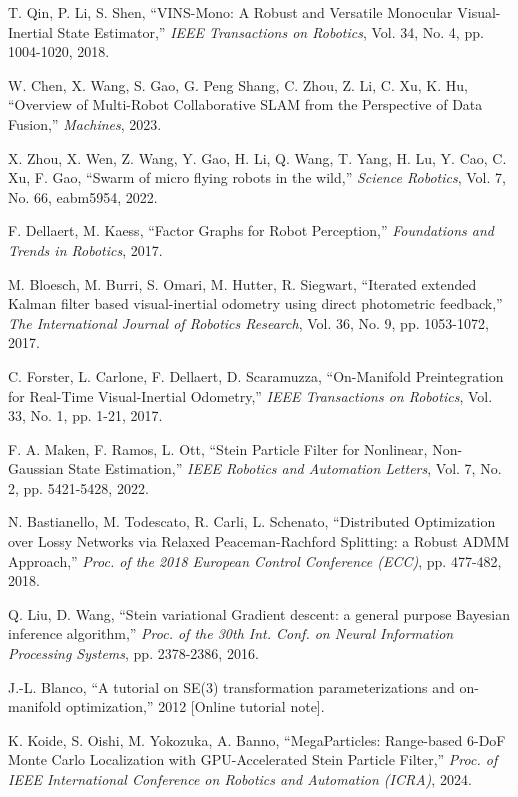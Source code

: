 \documentclass[a4paper,fleqn,10pt,twocolumn]{SICE_ISCS}
\begin{document}
\begin{thebibliography}{9}
T. Qin, P. Li, S. Shen, ``VINS-Mono: A Robust and Versatile Monocular Visual-Inertial State Estimator,'' {\it IEEE Transactions on Robotics}, Vol. 34, No. 4, pp. 1004-1020, 2018.

W. Chen, X. Wang, S. Gao, G. Peng Shang, C. Zhou, Z. Li, C. Xu, K. Hu, ``Overview of Multi-Robot Collaborative SLAM from the Perspective of Data Fusion,'' {\it Machines}, 2023.

X. Zhou, X. Wen, Z. Wang, Y. Gao, H. Li, Q. Wang, T. Yang, H. Lu, Y. Cao, C. Xu, F. Gao, ``Swarm of micro flying robots in the wild,'' {\it Science Robotics}, Vol. 7, No. 66, eabm5954, 2022.

F. Dellaert, M. Kaess, ``Factor Graphs for Robot Perception,'' {\it Foundations and Trends in Robotics}, 2017.

M. Bloesch, M. Burri, S. Omari, M. Hutter, R. Siegwart, ``Iterated extended Kalman filter based visual-inertial odometry using direct photometric feedback,'' {\it The International Journal of Robotics Research}, Vol. 36, No. 9, pp. 1053-1072, 2017.

C. Forster, L. Carlone, F. Dellaert, D. Scaramuzza, ``On-Manifold Preintegration for Real-Time Visual-Inertial Odometry,'' {\it IEEE Transactions on Robotics}, Vol. 33, No. 1, pp. 1-21, 2017.

F. A. Maken, F. Ramos, L. Ott, ``Stein Particle Filter for Nonlinear, Non-Gaussian State Estimation,'' {\it IEEE Robotics and Automation Letters}, Vol. 7, No. 2, pp. 5421-5428, 2022.

N. Bastianello, M. Todescato, R. Carli, L. Schenato, ``Distributed Optimization over Lossy Networks via Relaxed Peaceman-Rachford Splitting: a Robust ADMM Approach,'' {\it Proc. of the 2018 European Control Conference (ECC)}, pp. 477-482, 2018.

Q. Liu, D. Wang, ``Stein variational Gradient descent: a general purpose Bayesian inference algorithm,'' {\it Proc. of the 30th Int. Conf. on Neural Information Processing Systems}, pp. 2378-2386, 2016.

J.-L. Blanco, ``A tutorial on SE(3) transformation parameterizations and on-manifold optimization,'' 2012 [Online tutorial note].

K. Koide, S. Oishi, M. Yokozuka, A. Banno, ``MegaParticles: Range-based 6-DoF Monte Carlo Localization with GPU-Accelerated Stein Particle Filter,'' {\it Proc. of IEEE International Conference on Robotics and Automation (ICRA)}, 2024.


\end{thebibliography}
\end{document}
